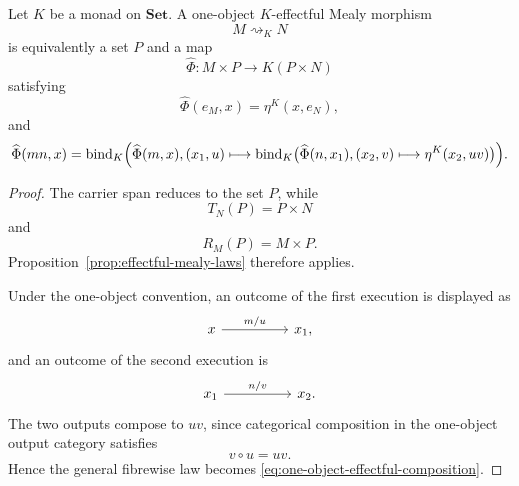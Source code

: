 \begin{proposition}
\label{prop:one-object-effectful-mealy-morphisms}
    Let \(K\) be a monad on \(\mathbf{Set}\). A one-object
    \(K\)-effectful Mealy morphism
    \[
        M\rightsquigarrow_KN
    \]
    is equivalently a set \(P\) and a map
    \[
        \widehat\Phi:
        M\times P
        \longrightarrow
        K(P\times N)
    \]
    satisfying
    \begin{equation}
        \widehat\Phi(e_M,x)
        =
        \eta^K(x,e_N),
        \label{eq:one-object-effectful-unit}
    \end{equation}
    and
    \begin{equation}
    \begin{aligned}
        \widehat\Phi(mn,x)
        =
        \operatorname{bind}_{K}
        \Bigl(
            \widehat\Phi(m,x),
            (x_1,u)
            \longmapsto
            \operatorname{bind}_{K}
            \bigl(
                \widehat\Phi(n,x_1),
                (x_2,v)
                \longmapsto
                \eta^K(x_2,uv)
            \bigr)
        \Bigr).
    \end{aligned}
    \label{eq:one-object-effectful-composition}
    \end{equation}
\end{proposition}
\begin{proof}
    The carrier span reduces to the set \(P\), while
    \[
        T_N(P)=P\times N
    \]
    and
    \[
        R_M(P)=M\times P.
    \]
    Proposition~\ref{prop:effectful-mealy-laws} therefore applies.

    Under the one-object convention, an outcome of the first execution is
    displayed as
    \[
        \begin{tikzcd}[column sep=huge]
                x
                    \arrow[r, "{m/u}"]
            &
                x_1,
        \end{tikzcd}
    \]
    and an outcome of the second execution is
    \[
        \begin{tikzcd}[column sep=huge]
                x_1
                    \arrow[r, "{n/v}"]
            &
                x_2.
        \end{tikzcd}
    \]
    The two outputs compose to \(uv\), since categorical composition in the
    one-object output category satisfies
    \[
        v\circ u=uv.
    \]
    Hence the general fibrewise law becomes
    \eqref{eq:one-object-effectful-composition}.
\end{proof}

